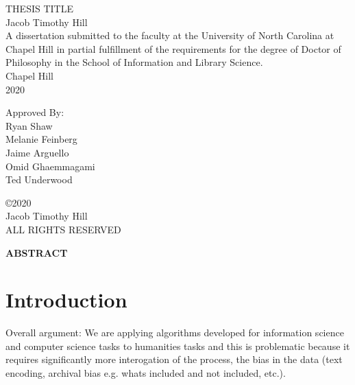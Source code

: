 \documentclass[12pt, oneside]{report}
\begin{document}
	\thispagestyle{empty}

	\begin{center}
		\singlespacing
		\vspace{4in}
		THESIS TITLE\\
		\vspace{1in}
		Jacob Timothy Hill\\
		\vspace{1in}
		A dissertation submitted to the faculty at the University of North Carolina at Chapel Hill in partial fulfillment of the requirements for the degree of Doctor of Philosophy in the School of Information and Library Science.\\
		\vspace{1in}
		Chapel Hill\\
		2020
		\vspace{1in}
	\end{center}
	\begin{raggedleft}
		Approved By:\\
		Ryan Shaw\\
		Melanie Feinberg\\
		Jaime Arguello\\
		Omid Ghaemmagami\\
		Ted Underwood\\
	\end{raggedleft}
\newpage
\begin{center}
	\vspace*{\fill}
	\copyright 2020\\
	Jacob Timothy Hill\\
	ALL RIGHTS RESERVED
	\vspace{1in}
\end{center}
\begin{center}
	\textbf{ABSTRACT}
\end{center}
\setlength{\parindent}{15pt}
\tableofcontents
\newpage
\listoffigures
\chapter{Introduction}
Overall argument: We are applying algorithms developed for information science and computer science tasks to humanities tasks and this is problematic because it requires significantly more interogation of the process, the bias in the data (text encoding, archival bias e.g. whats included and not included, etc.).
\end{document}
